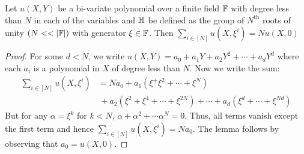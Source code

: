 \begin{comment}
    But $$p(\xi^{\alpha})=\prod_{i \in K}(\xi^{\alpha}-\xi^i)=\prod_{i \in K'\setminus \{\alpha\}}(\xi^{\alpha}-\xi^i)$$ and $$p'(\xi^{\alpha})=\sum_{j \in K} \prod_{i \in K \setminus \{j\}}(\xi^{\alpha}-\xi^i)=\sum_{j \in K'\setminus \{\alpha\}} \prod_{i \in K' \setminus \{j, \alpha\}}(\xi^{\alpha}-\xi^i)$$
    But now, note that $$\sum_{j \in K'\setminus \{\alpha\}} \prod_{i \in K' \setminus \{j, \alpha\}}(\xi^{\alpha}-\xi^i)=\prod_{i \in K' \setminus \{ \alpha\}}(\xi^{\alpha}-\xi^i)\sum_{j \in K'\setminus \{\alpha\}}\frac{1}{\xi^{\alpha}-\xi^j}$$
    So, $$\frac{2p'(\xi^{\alpha})}{p(\xi^{\alpha})}=\frac{2\cdot \prod_{i \in K' \setminus \{ \alpha\}}(\xi^{\alpha}-\xi^i)\sum_{j \in K'\setminus \{\alpha\}}\frac{1}{\xi^{\alpha}-\xi^j}}{\prod_{i \in K'\setminus \{\alpha\}}(\xi^{\alpha}-\xi^i)}=$$\\
    $$=2\cdot\sum_{j \in K'\setminus \{\alpha\}}\frac{1}{\xi^{\alpha}-\xi^j}$$

    This completes the proof of case 2 and thus the proof of the lemma.
\end{comment}

\begin{lemma}[Sumcheck]\label{lem:sumcheck}
Let $u(X,Y)$ be a bi-variate polynomial over a finite field $\mathbb{F}$ with degree less than $N$ in each of the variables and
$\mathbb{H}$ be defined as the group of $N^{\text{th}}$ roots of unity $(N<<|\F|)$
with generator $\xi \in \mathbb{F}$. Then $\sum_{i\in [N]}u(X,\xi^i)= Nu(X,0)$
\end{lemma}

\begin{proof}
    For some $d<N$, we write $u(X,Y)=a_0+a_1 Y+ a_2 Y^2+\cdots+ a_d Y^d$
    where each $a_i$ is a polynomial in $X$ of degree less than $N$.
    Now we write the sum:
    \begin{align*}
        \sum_{i\in [N]}u(X,\xi^i) &= N a_0+a_1(\xi^+\xi^2+\cdots+\xi^N) \\
        &\, +a_2(\xi^2+\xi^4+\cdots+\xi^{2N})+ \cdots + a_d(\xi^d+\cdots +\xi^{Nd})
    \end{align*}
    But for any $\alpha=\xi^k$ for $k<N$, $\alpha+\alpha^2+\cdots \alpha^N=0$. Thus, all terms vanish except the first term
    and hence $\sum_{i\in [N]}u(X,\xi^i)=N a_0$.
    The lemma follows by observing that $a_0=u(X, 0)$.
\end{proof}

